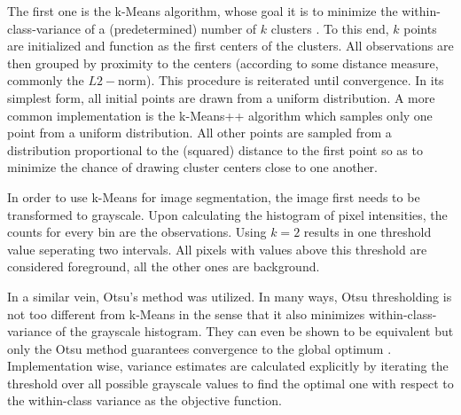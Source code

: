 The first one is the k-Means algorithm, whose goal it is to minimize the within-class-variance of a (predetermined) number of $k$ clusters \cite{bishop2006}. To this end, $k$ points are initialized and function as the first centers of the clusters. All observations are then grouped by proximity to the centers (according to some distance measure, commonly the $L2-$norm). This procedure is reiterated until convergence. In its simplest form, all initial points are drawn from a uniform distribution. A more common implementation is the k-Means++ algorithm \cite{kmeans} which samples only one point from a uniform distribution. All other points are sampled from a distribution proportional to the (squared) distance to the first point so as to minimize the chance of drawing cluster centers close to one another.

In order to use k-Means for image segmentation, the image first needs to be transformed to grayscale. Upon calculating the histogram of pixel intensities, the counts for every bin are the observations. Using $k = 2$ results in one threshold value seperating two intervals. All pixels with values above this threshold are considered foreground, all the other ones are background.

In a similar vein, Otsu's method \cite{otsu} was utilized. In many ways, Otsu thresholding is not too different from k-Means in the sense that it also minimizes within-class-variance of the grayscale histogram. They can even be shown to be equivalent but only the Otsu method guarantees convergence to the global optimum \cite{liu2009otsu}. Implementation wise, variance estimates are calculated explicitly by iterating the threshold over all possible grayscale values to find the optimal one with respect to the within-class variance as the objective function.

